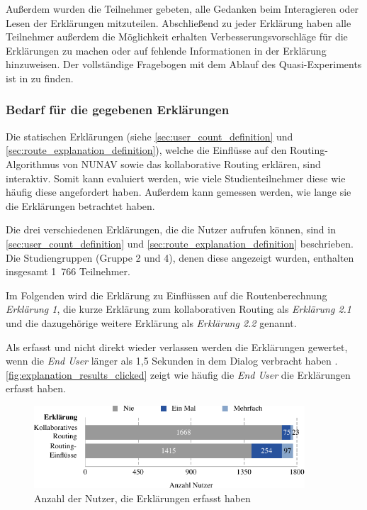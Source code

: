 Außerdem wurden die Teilnehmer gebeten, alle Gedanken beim Interagieren oder Lesen der Erklärungen mitzuteilen. Abschließend zu jeder Erklärung haben alle Teilnehmer außerdem die Möglichkeit erhalten Verbesserungsvorschläge für die Erklärungen zu machen oder auf fehlende Informationen in der Erklärung hinzuweisen. Der vollständige Fragebogen mit dem Ablauf des Quasi-Experiments ist in  zu finden.

\subsubsection{Bedarf für die gegebenen Erklärungen}

Die statischen Erklärungen (siehe \autoref{sec:user_count_definition} und \autoref{sec:route_explanation_definition}), welche die Einflüsse auf den Routing-Algorithmus von NUNAV sowie das kollaborative Routing erklären, sind interaktiv. Somit kann evaluiert werden, wie viele Studienteilnehmer diese wie häufig diese angefordert haben. Außerdem kann gemessen werden, wie lange sie die Erklärungen betrachtet haben.

Die drei verschiedenen Erklärungen, die die Nutzer aufrufen können, sind in \autoref{sec:user_count_definition} und \autoref{sec:route_explanation_definition} beschrieben. Die Studiengruppen (Gruppe 2 und 4), denen diese angezeigt wurden, enthalten insgesamt 1~766 Teilnehmer.

Im Folgenden wird die Erklärung zu Einflüssen auf die Routenberechnung \textit{Erklärung 1}, die kurze Erklärung zum kollaborativen Routing als \textit{Erklärung 2.1} und die dazugehörige weitere Erklärung als \textit{Erklärung 2.2} genannt.

Als erfasst und nicht direkt wieder verlassen werden die Erklärungen gewertet, wenn die \textit{End User} länger als 1,5 Sekunden in dem Dialog verbracht haben \cite{BAHR2011776}. \autoref{fig:explanation_results_clicked} zeigt wie häufig die \textit{End User} die Erklärungen erfasst haben. 

\begin{figure}[htb!]
    \centering
    \includegraphics[width=0.9\textwidth]{contents/06_model_evaluation/02_evaluation/res/explanation_results_clicked.pdf}
    \caption{Anzahl der Nutzer, die Erklärungen erfasst haben}
    \label{fig:explanation_results_clicked}
\end{figure}


